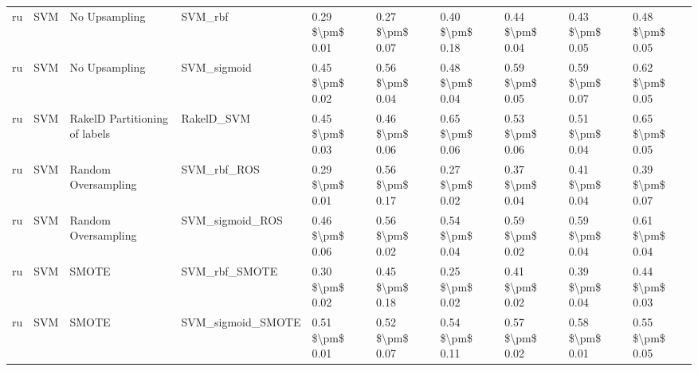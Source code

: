 \begin{tabular}{llllllllll}
      ru &                             SVM &                 No Upsampling &                                      SVM\_rbf &     0.29 \$\textbackslash pm\$ 0.01 &           0.27 \$\textbackslash pm\$ 0.07 &       0.40 \$\textbackslash pm\$ 0.18 &        0.44 \$\textbackslash pm\$ 0.04 &                         0.43 \$\textbackslash pm\$ 0.05 & 0.48 \$\textbackslash pm\$ 0.05 \\
      ru &                             SVM &                 No Upsampling &                                  SVM\_sigmoid &     0.45 \$\textbackslash pm\$ 0.02 &           0.56 \$\textbackslash pm\$ 0.04 &       0.48 \$\textbackslash pm\$ 0.04 &        0.59 \$\textbackslash pm\$ 0.05 &                         0.59 \$\textbackslash pm\$ 0.07 & 0.62 \$\textbackslash pm\$ 0.05 \\
      ru &                             SVM & RakelD Partitioning of labels &                                   RakelD\_SVM &     0.45 \$\textbackslash pm\$ 0.03 &           0.46 \$\textbackslash pm\$ 0.06 &       0.65 \$\textbackslash pm\$ 0.06 &        0.53 \$\textbackslash pm\$ 0.06 &                         0.51 \$\textbackslash pm\$ 0.04 & 0.65 \$\textbackslash pm\$ 0.05 \\
      ru &                             SVM &           Random Oversampling &                                  SVM\_rbf\_ROS &     0.29 \$\textbackslash pm\$ 0.01 &           0.56 \$\textbackslash pm\$ 0.17 &       0.27 \$\textbackslash pm\$ 0.02 &        0.37 \$\textbackslash pm\$ 0.04 &                         0.41 \$\textbackslash pm\$ 0.04 & 0.39 \$\textbackslash pm\$ 0.07 \\
      ru &                             SVM &           Random Oversampling &                              SVM\_sigmoid\_ROS &     0.46 \$\textbackslash pm\$ 0.06 &           0.56 \$\textbackslash pm\$ 0.02 &       0.54 \$\textbackslash pm\$ 0.04 &        0.59 \$\textbackslash pm\$ 0.02 &                         0.59 \$\textbackslash pm\$ 0.04 & 0.61 \$\textbackslash pm\$ 0.04 \\
      ru &                             SVM &                         SMOTE &                                SVM\_rbf\_SMOTE &     0.30 \$\textbackslash pm\$ 0.02 &           0.45 \$\textbackslash pm\$ 0.18 &       0.25 \$\textbackslash pm\$ 0.02 &        0.41 \$\textbackslash pm\$ 0.02 &                         0.39 \$\textbackslash pm\$ 0.04 & 0.44 \$\textbackslash pm\$ 0.03 \\
      ru &                             SVM &                         SMOTE &                            SVM\_sigmoid\_SMOTE &     0.51 \$\textbackslash pm\$ 0.01 &           0.52 \$\textbackslash pm\$ 0.07 &       0.54 \$\textbackslash pm\$ 0.11 &        0.57 \$\textbackslash pm\$ 0.02 &                         0.58 \$\textbackslash pm\$ 0.01 & 0.55 \$\textbackslash pm\$ 0.05 \\

\end{tabular}
